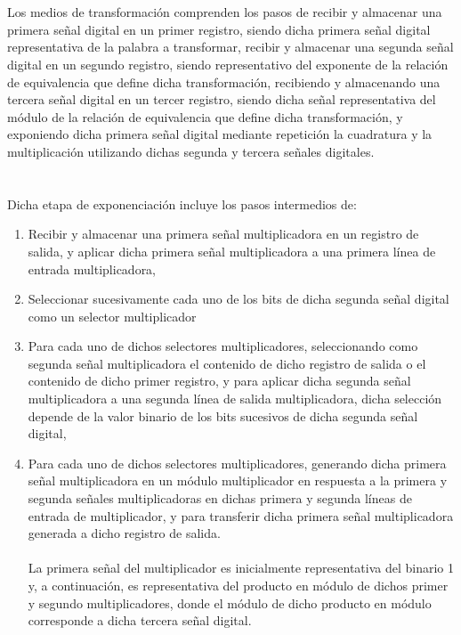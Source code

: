 \documentclass[12pt, a4paper]{article}
\begin{document}
	\\
	\\Los medios de transformación comprenden los pasos de recibir y almacenar una primera señal digital en un primer registro, siendo dicha primera señal digital representativa de la palabra a transformar, recibir y almacenar una segunda señal digital en un segundo registro, siendo representativo del exponente de la relación de equivalencia que define dicha transformación, recibiendo y almacenando una tercera señal digital en un tercer registro, siendo dicha señal representativa del módulo de la relación de equivalencia que define dicha transformación, y exponiendo dicha primera señal digital mediante repetición la cuadratura y la multiplicación utilizando dichas segunda y tercera señales digitales.
	\\
	\\
	\\Dicha etapa de exponenciación incluye los pasos intermedios de:
	\begin{enumerate}[label=\Alph*)]
		\item Recibir y almacenar una primera señal multiplicadora en un registro de salida, y aplicar dicha primera señal multiplicadora a una primera línea de entrada multiplicadora,
		\item Seleccionar sucesivamente cada uno de los bits de dicha segunda señal digital como un selector multiplicador
		\item Para cada uno de dichos selectores multiplicadores, seleccionando como segunda señal multiplicadora el contenido de dicho registro de salida o el contenido de dicho primer registro, y para aplicar dicha segunda señal multiplicadora a una segunda línea de salida multiplicadora, dicha selección depende de la valor binario de los bits sucesivos de dicha segunda señal digital,
		\item Para cada uno de dichos selectores multiplicadores, generando dicha primera señal multiplicadora en un módulo multiplicador en respuesta a la primera y segunda señales multiplicadoras en dichas primera y segunda líneas de entrada de multiplicador, y para transferir dicha primera señal multiplicadora generada a dicho registro de salida.
		\\
		\\ La primera señal del multiplicador es inicialmente representativa del binario 1 y, a continuación, es representativa del producto en módulo de dichos primer y segundo multiplicadores, donde el módulo de dicho producto en módulo corresponde a dicha tercera señal digital.
	\end{enumerate}
\end{document}
